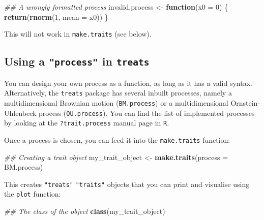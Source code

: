 \documentclass[
]{book}
\newenvironment{Shaded}{\begin{snugshade}}{\end{snugshade}}
\newcommand{\CommentTok}[1]{\textcolor[rgb]{0.56,0.35,0.01}{\textit{#1}}}
\newcommand{\ControlFlowTok}[1]{\textcolor[rgb]{0.13,0.29,0.53}{\textbf{#1}}}
\newcommand{\DataTypeTok}[1]{\textcolor[rgb]{0.13,0.29,0.53}{#1}}
\newcommand{\DecValTok}[1]{\textcolor[rgb]{0.00,0.00,0.81}{#1}}
\newcommand{\KeywordTok}[1]{\textcolor[rgb]{0.13,0.29,0.53}{\textbf{#1}}}
\newcommand{\NormalTok}[1]{#1}
\newcommand{\StringTok}[1]{\textcolor[rgb]{0.31,0.60,0.02}{#1}}
\begin{document}
\begin{Shaded}
\begin{Highlighting}[]
\CommentTok{\#\# A wrongly formatted process}
\NormalTok{invalid.process \textless{}{-}}\StringTok{ }\ControlFlowTok{function}\NormalTok{(}\DataTypeTok{x0 =} \DecValTok{0}\NormalTok{) \{}
    \KeywordTok{return}\NormalTok{(}\KeywordTok{rnorm}\NormalTok{(}\DecValTok{1}\NormalTok{, }\DataTypeTok{mean =}\NormalTok{ x0))}
\NormalTok{\}}
\end{Highlighting}
\end{Shaded}

This will not work in \texttt{make.traits} (see below).

\hypertarget{using-a-process-in-treats}{%
\subsection{\texorpdfstring{Using a \texttt{"process"} in \texttt{treats}}{Using a "process" in treats}}\label{using-a-process-in-treats}}

You can design your own process as a function, as long as it has a valid syntax.
Alternatively, the \texttt{treats} package has several inbuilt processes, namely a multidimensional Brownian motion (\texttt{BM.process}) or a multidimensional Ornstein-Uhlenbeck process (\texttt{OU.process}).
You can find the list of implemented processes by looking at the \texttt{?trait.process} manual page in \texttt{R}.

Once a process is chosen, you can feed it into the \texttt{make.traits} function:

\begin{Shaded}
\begin{Highlighting}[]
\CommentTok{\#\# Creating a trait object}
\NormalTok{my\_trait\_object \textless{}{-}}\StringTok{ }\KeywordTok{make.traits}\NormalTok{(}\DataTypeTok{process =}\NormalTok{ BM.process)}
\end{Highlighting}
\end{Shaded}

This creates \texttt{"treats"} \texttt{"traits"} objects that you can print and visualise using the \texttt{plot} function:

\begin{Shaded}
\begin{Highlighting}[]
\CommentTok{\#\# The class of the object}
\KeywordTok{class}\NormalTok{(my\_trait\_object)}
\end{Highlighting}
\end{Shaded}
\end{document}
